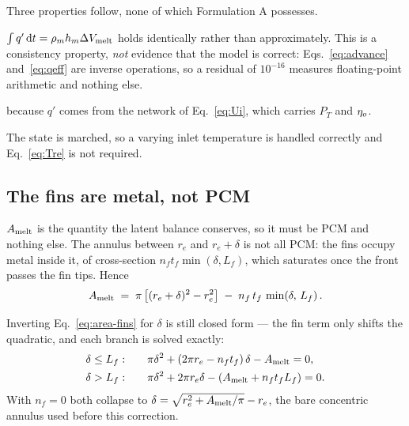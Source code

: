 Three properties follow, none of which Formulation A possesses.

\begin{description}[leftmargin=1.6em,itemsep=2pt]
\item[Closure is structural.] $\int q'\,\mathrm{d}t = \rho_{m}h_{m}\Delta V_{\mathrm{melt}}$
  holds identically rather than approximately. This is a consistency property,
  \emph{not} evidence that the model is correct: Eqs.~\eqref{eq:advance}
  and~\eqref{eq:qeff} are inverse operations, so a residual of $10^{-16}$
  measures floating-point arithmetic and nothing else.
\item[The fins enter the front automatically,] because $q'$ comes from the
  network of Eq.~\eqref{eq:Ui}, which carries $P_{T}$ and $\eta_{o}$.
\item[$\Tre$ need not be constant.] The state is marched, so a varying inlet
  temperature is handled correctly and Eq.~\eqref{eq:Tre} is not required.
\end{description}

\subsection{The fins are metal, not PCM}
\label{sec:front:finmetal}

$A_{\mathrm{melt}}$ is the quantity the latent balance conserves, so it must be PCM and
nothing else. The annulus between $r_{e}$ and $r_{e}+\delta$ is not all PCM: the
fins occupy metal inside it, of cross-section $n_{f}t_{f}\min(\delta,L_{f})$,
which saturates once the front passes the fin tips. Hence
\begin{equation}
  A_{\mathrm{melt}} \;=\; \pi\left[(r_{e}+\delta)^{2}-r_{e}^{2}\right]
  \;-\; n_{f}\,t_{f}\,\min\!\left(\delta,\,L_{f}\right).
  \label{eq:area-fins}
\end{equation}

Inverting Eq.~\eqref{eq:area-fins} for $\delta$ is still closed form --- the fin
term only shifts the quadratic, and each branch is solved exactly:
\begin{align}
  \delta \le L_{f}: &\qquad
    \pi\delta^{2}+\left(2\pi r_{e}-n_{f}t_{f}\right)\delta-A_{\mathrm{melt}} = 0,
  \label{eq:delta-in}\\
  \delta > L_{f}: &\qquad
    \pi\delta^{2}+2\pi r_{e}\delta-\left(A_{\mathrm{melt}}+n_{f}t_{f}L_{f}\right) = 0 .
  \label{eq:delta-out}
\end{align}
With $n_{f}=0$ both collapse to $\delta=\sqrt{r_{e}^{2}+A_{\mathrm{melt}}/\pi}-r_{e}$, the
bare concentric annulus used before this correction.

